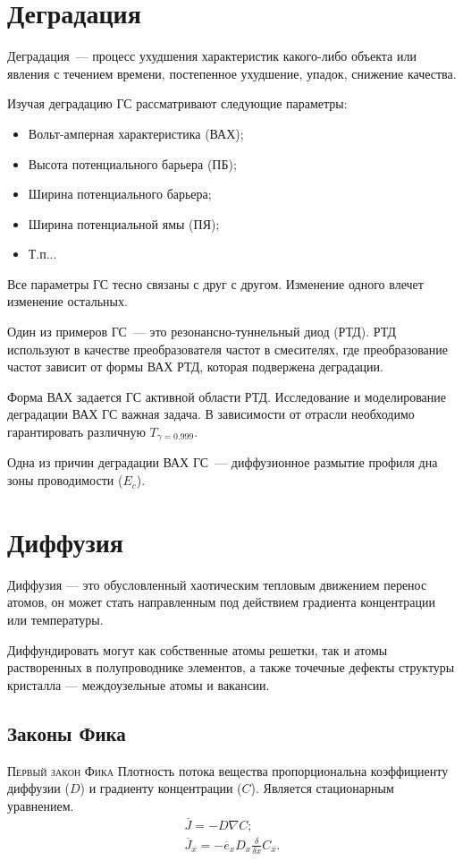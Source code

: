 \section{Деградация}
Деградация~--- процесс ухудшения характеристик какого-либо объекта или явления с течением времени, постепенное ухудшение, упадок, снижение качества.

Изучая деградацию ГС рассматривают следующие параметры:
\begin{itemize}
	\item Вольт-амперная характеристика (ВАХ);
	\item Высота потенциального барьера (ПБ);
	\item Ширина потенциального барьера;
	\item Ширина потенциальной ямы (ПЯ);
	\item Т.п...
\end{itemize}

Все параметры ГС тесно связаны с друг с другом. Изменение одного влечет изменение остальных.

Один из примеров ГС~--- это резонансно-туннельный диод (РТД). РТД используют в качестве преобразователя частот в смесителях, где преобразование частот зависит от формы ВАХ РТД, которая подвержена деградации.

Форма ВАХ задается ГС активной области РТД. Исследование и моделирование деградации ВАХ ГС важная задача. В зависимости от отрасли необходимо гарантировать различную $T_{\gamma=0.999}$.

Одна из причин деградации ВАХ ГС~--- диффузионное размытие профиля дна зоны проводимости ($E_{c}$).

\section{Диффузия}
Диффузия — это обусловленный хаотическим тепловым движением перенос атомов, он может стать направленным под действием градиента концентрации или температуры.

Диффундировать могут как собственные атомы решетки, так и атомы растворенных в полупроводнике элементов, а также точечные дефекты структуры кристалла — междоузельные атомы и вакансии.

\subsection{Законы Фика}
\begin{definition}{\textsc{Первый закон Фика}}
	Плотность потока вещества пропорциональна коэффициенту диффузии ($D$) и градиенту концентрации ($C$). Является стационарным уравнением.
	\begin{gather}
		\overline{J} = - D \nabla C;\\
		\overline{J}_{x} = - \overline{e}_{x}D_{x} \frac{\delta}{\delta x} C_{x}.\\
	\end{gather}
\end{definition}

